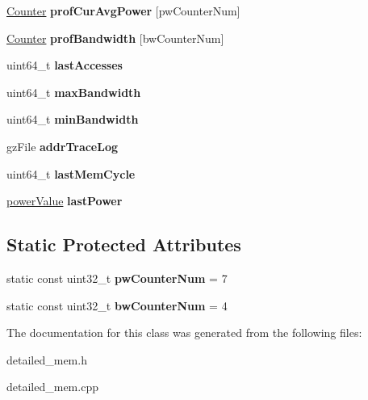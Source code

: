 \begin{DoxyCompactItemize}
\item 
\hypertarget{classMemControllerBase_a02f29728a18f67902b8a623054123487}{\hyperlink{classCounter}{Counter} {\bfseries prof\-Cur\-Avg\-Power} \mbox{[}pw\-Counter\-Num\mbox{]}}\label{classMemControllerBase_a02f29728a18f67902b8a623054123487}

\item 
\hypertarget{classMemControllerBase_ae934f4caa64c95e622cbaa8f98351e14}{\hyperlink{classCounter}{Counter} {\bfseries prof\-Bandwidth} \mbox{[}bw\-Counter\-Num\mbox{]}}\label{classMemControllerBase_ae934f4caa64c95e622cbaa8f98351e14}

\item 
\hypertarget{classMemControllerBase_a032e3ffd8e0802deb05e31b777077370}{uint64\-\_\-t {\bfseries last\-Accesses}}\label{classMemControllerBase_a032e3ffd8e0802deb05e31b777077370}

\item 
\hypertarget{classMemControllerBase_a0984e4d7df120b26b706e7462d660a89}{uint64\-\_\-t {\bfseries max\-Bandwidth}}\label{classMemControllerBase_a0984e4d7df120b26b706e7462d660a89}

\item 
\hypertarget{classMemControllerBase_af72b5a84705a24abca3be393b2b3b18f}{uint64\-\_\-t {\bfseries min\-Bandwidth}}\label{classMemControllerBase_af72b5a84705a24abca3be393b2b3b18f}

\item 
\hypertarget{classMemControllerBase_a0fc1ddd85369eefdb19fa006bb63237f}{gz\-File {\bfseries addr\-Trace\-Log}}\label{classMemControllerBase_a0fc1ddd85369eefdb19fa006bb63237f}

\item 
\hypertarget{classMemControllerBase_a89831cb6c1db3cea2d480afcab072718}{uint64\-\_\-t {\bfseries last\-Mem\-Cycle}}\label{classMemControllerBase_a89831cb6c1db3cea2d480afcab072718}

\item 
\hypertarget{classMemControllerBase_a2570f098bda4e1d3a1e9ba84304f4f45}{\hyperlink{structMemControllerBase_1_1powerValue}{power\-Value} {\bfseries last\-Power}}\label{classMemControllerBase_a2570f098bda4e1d3a1e9ba84304f4f45}

\end{DoxyCompactItemize}
\subsection*{Static Protected Attributes}
\begin{DoxyCompactItemize}
\item 
\hypertarget{classMemControllerBase_a6bf1d9fd5b60dfa7052f176868311cb0}{static const uint32\-\_\-t {\bfseries pw\-Counter\-Num} = 7}\label{classMemControllerBase_a6bf1d9fd5b60dfa7052f176868311cb0}

\item 
\hypertarget{classMemControllerBase_aca3b9eee9fffbca63cbc58e698840b41}{static const uint32\-\_\-t {\bfseries bw\-Counter\-Num} = 4}\label{classMemControllerBase_aca3b9eee9fffbca63cbc58e698840b41}

\end{DoxyCompactItemize}


The documentation for this class was generated from the following files\-:\begin{DoxyCompactItemize}
\item 
detailed\-\_\-mem.\-h\item 
detailed\-\_\-mem.\-cpp\end{DoxyCompactItemize}
